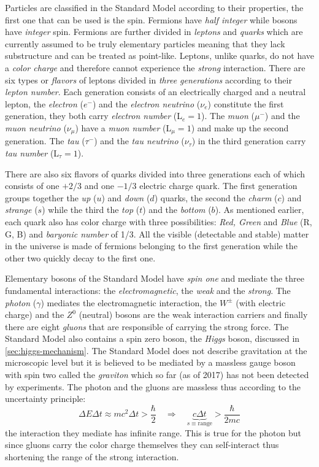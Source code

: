 Particles are classified in the Standard Model according to their properties,
the first one that can be used is the spin. Fermions have \emph{half integer}
while bosons have \emph{integer} spin. Fermions are further divided in
\emph{leptons} and \emph{quarks} which are currently assumed to be truly
elementary particles meaning that they lack substructure and can be treated as
point-like. Leptons, unlike quarks, do not have a \emph{color charge} and
therefore cannot experience the \emph{strong} interaction. There are six types
or \emph{flavors} of leptons divided in \emph{three generations} according to
their \emph{lepton number}. Each generation consists of an electrically charged
and a neutral lepton, the \emph{electron} ($e^-$) and the \emph{electron
  neutrino} ($\nu_e$) constitute the first generation, they both carry
\emph{electron number} (L$_e = 1$). The \emph{muon} ($\mu^-$) and the \emph{muon
  neutrino} ($\nu_\mu$) have a \emph{muon number} (L$_\mu = 1$) and make up the
second generation. The \emph{tau} ($\tau^-$) and the \emph{tau neutrino}
($\nu_\tau$) in the third generation carry \emph{tau number} (L$_\tau = 1$).

There are also six flavors of quarks divided into three generations each of
which consists of one $+2/3$ and one $-1/3$ electric charge quark. The first
generation groups together the \emph{up} ($u$) and \emph{down} ($d$) quarks, the
second the \emph{charm} ($c$) and \emph{strange} ($s$) while the third the
\emph{top} ($t$) and the \emph{bottom} ($b$). As mentioned earlier, each quark
also has color charge with three possibilities: \emph{Red, Green} and
\emph{Blue} (R, G, B) and \emph{baryonic number} of 1/3. All the visible
(detectable and stable) matter in the universe is made of fermions belonging to
the first generation while the other two quickly decay to the first one.

Elementary bosons of the Standard Model have \emph{spin one} and mediate the
three fundamental interactions: the \emph{electromagnetic}, the \emph{weak} and
the \emph{strong}. The \emph{photon} ($\gamma$) mediates the electromagnetic
interaction, the $W^\pm$ (with electric charge) and the $Z^0$ (neutral) bosons
are the weak interaction carriers and finally there are eight \emph{gluons} that
are responsible of carrying the strong force. The Standard Model also contains a
spin zero boson, the \emph{Higgs} boson, discussed in
\cref{sec:higgs-mechanism}. The Standard Model does not describe gravitation at
the microscopic level but it is believed to be mediated by a massless gauge
boson with spin two called the \emph{graviton} which so far (as of 2017) has not
been detected by experiments. The photon and the gluons are massless thus
according to the uncertainty principle:
\begin{equation}
  \label{eq:149}
  \Delta E \Delta t \approx mc^2 \Delta t > \frac{\hbar}{2} \quad \Rightarrow \quad
  \underbrace{c \Delta t}_{s \equiv \mathrm{range}} > \frac{\hbar}{2mc}
\end{equation}
the interaction they mediate has infinite range. This is true for the photon but
since gluons carry the color charge themselves they can self-interact thus
shortening the range of the strong interaction.

